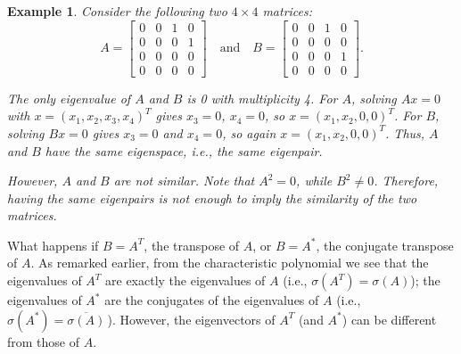 \documentclass{article}
\newtheorem{exa}{Example}
\begin{document}
\begin{exa}\rm
Consider the following two \(4 \times 4\) matrices:
\[
A = \begin{bmatrix}
0 & 0 & 1 & 0 \\
0 & 0 & 0 & 1 \\
0 & 0 & 0 & 0 \\
0 & 0 & 0 & 0
\end{bmatrix}\quad \mbox{and}\quad
B = \begin{bmatrix}
0 & 0 & 1 & 0 \\
0 & 0 & 0 & 0 \\
0 & 0 & 0 & 1 \\
0 & 0 & 0 & 0
\end{bmatrix}.
\]

The only eigenvalue  of $A$ and $B$ is 0
 with multiplicity 4. For $A$, solving $Ax=0$ with $x=(x_1, x_2, x_3, x_4)^T$  gives $x_3=0$, $x_4=0$, so $x=(x_1, x_2, 0, 0)^T$.
For $B$, solving $Bx=0$ gives $x_3=0$ and $x_4=0$, so again $x=(x_1, x_2, 0,0)^T$. Thus, $A$ and $B$  have the same eigenspace, i.e., the same eigenpair.
\medskip

However, $A$ and $B$ are not similar. Note that
$A^2 = 0$, %
while $B^2 \neq 0$.
Therefore, having the same eigenpairs is not enough to imply the similarity of the
two matrices.
\end{exa}

What happens if $B=A^T$, the transpose of $A$, or $B=A^*$, the conjugate transpose of $A$. As remarked earlier, from the characteristic polynomial we see that the  eigenvalues of $A^T$ are exactly the eigenvalues of $A$ (i.e., $\sigma (A^T)=\sigma (A)$);
the eigenvalues of $A^*$ are the conjugates of the eigenvalues of $A$
 (i.e.,  $\sigma (A^*)=\overline{\sigma (A)}$\,).  However,
the eigenvectors of $A^T$ (and $A^*$) can be different from those of $A$.
\end{document}
